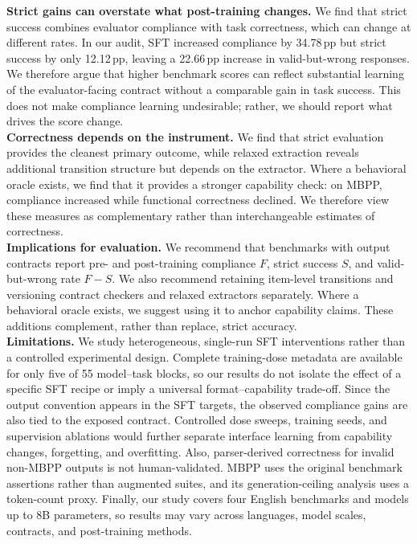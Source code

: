 \documentclass{article}
\newcommand{\pp}{\,pp}
\begin{document}
\noindent\textbf{Strict gains can overstate what post-training changes.}
We find that strict success combines evaluator compliance with task correctness,
which can change at different rates. In our audit, SFT increased compliance by
34.78\pp{} but strict success by only 12.12\pp{}, leaving a 22.66\pp{} increase
in valid-but-wrong responses. We therefore argue that higher benchmark scores
can reflect substantial learning of the evaluator-facing contract without a
comparable gain in task success. This does not make compliance learning
undesirable; rather, we should report what drives the score change.
\\
\noindent\textbf{Correctness depends on the instrument.}
We find that strict evaluation provides the cleanest primary outcome, while
relaxed extraction reveals additional transition structure but depends on the
extractor. Where a behavioral oracle exists, we find that it provides a
stronger capability check: on MBPP, compliance increased while functional
correctness declined. We therefore view these measures as complementary rather
than interchangeable estimates of correctness.
\\
\noindent\textbf{Implications for evaluation.}
We recommend that benchmarks with output contracts report pre- and post-training
compliance \(F\), strict success \(S\), and valid-but-wrong rate \(F-S\). We
also recommend retaining item-level transitions and versioning contract
checkers and relaxed extractors separately. Where a behavioral oracle exists,
we suggest using it to anchor capability claims. These additions complement,
rather than replace, strict accuracy.
\\
\noindent\textbf{Limitations.}
We study heterogeneous, single-run SFT interventions rather than a controlled
experimental design. Complete training-dose metadata are available for only
five of 55 model--task blocks, so our results do not isolate the effect of a
specific SFT recipe or imply a universal format--capability trade-off. Since
the output convention appears in the SFT targets, the observed compliance
gains are also tied to the exposed contract. Controlled dose sweeps, training
seeds, and supervision ablations would further separate interface learning
from capability changes, forgetting, and overfitting.
Also, parser-derived correctness for invalid non-MBPP outputs is not human-validated.
MBPP uses the original benchmark assertions rather than augmented suites, and
its generation-ceiling analysis uses a token-count proxy. Finally, our study
covers four English benchmarks and models up to 8B parameters, so results may
vary across languages, model scales, contracts, and post-training methods.
\end{document}
